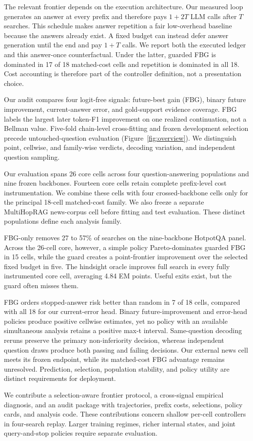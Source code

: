 The relevant frontier depends on the execution architecture. Our measured
loop generates an answer at every prefix and therefore pays $1+2T$ LLM calls
after $T$ searches. This schedule makes answer repetition a fair low-overhead
baseline because the answers already exist. A fixed budget can instead defer
answer generation until the end and pay $1+T$ calls. We report both the
executed ledger and this answer-once counterfactual. Under the latter, guarded
FBG is dominated in 17 of 18 matched-cost cells and repetition is dominated in
all 18. Cost accounting is therefore part of the controller definition, not a
presentation choice.

Our audit compares four logit-free signals: future-best gain (FBG), binary
future improvement, current-answer error, and gold-support evidence coverage.
FBG labels the largest later token-F1 improvement on one realized continuation,
not a Bellman value. Five-fold chain-level cross-fitting and frozen
development selection precede untouched-question evaluation
(Figure~\ref{fig:overview}). We distinguish point, cellwise, and family-wise
verdicts, decoding variation, and independent question sampling.

Our evaluation spans 26 core cells across four question-answering populations
and nine frozen backbones. Fourteen core cells retain complete prefix-level
cost instrumentation. We combine these cells with four crossed-backbone cells
only for the principal 18-cell matched-cost family. We also freeze a separate
MultiHopRAG news-corpus cell before fitting and test evaluation. These distinct populations define each analysis family.

FBG-only removes 27 to 57\% of searches on the nine-backbone
HotpotQA panel. Across the 26-cell core, however, a simple policy
Pareto-dominates guarded FBG in 15
cells, while the guard creates a point-frontier improvement over the selected
fixed budget in five. The hindsight oracle improves full search in every fully instrumented core
cell, averaging 4.84 EM points. Useful exits exist, but the guard often misses them.

FBG orders
stopped-answer risk better than random in 7 of 18 cells, compared with all 18
for our current-error head. Binary future-improvement and error-head policies
produce positive cellwise estimates, yet no policy with an available
simultaneous analysis retains a positive max-t interval. Same-question decoding
reruns preserve the primary non-inferiority decision, whereas independent
question draws produce both passing and failing decisions. Our external news
cell meets its frozen endpoint, while its matched-cost FBG advantage remains
unresolved. Prediction, selection, population stability, and policy utility are distinct
requirements for deployment.

We contribute a selection-aware frontier protocol, a cross-signal empirical
diagnosis, and an audit package with trajectories, prefix costs, selections,
policy cards, and analysis code. These contributions concern shallow per-cell
controllers in four-search replay. Larger training regimes, richer internal
states, and joint query-and-stop policies require separate evaluation.
